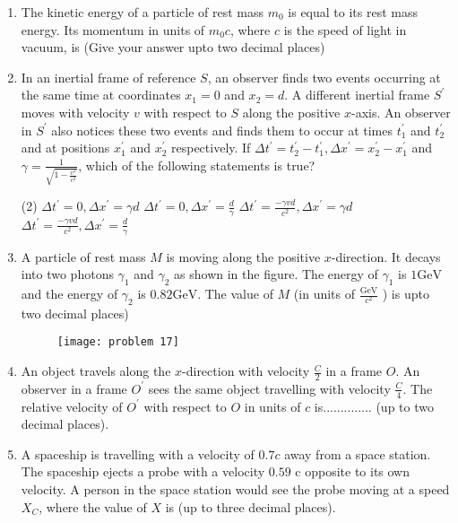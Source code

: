 \begin{enumerate}
	\item The kinetic energy of a particle of rest mass $m_{0}$ is equal to its rest mass energy. Its momentum in units of $m_{0} c$, where $c$ is the speed of light in vacuum, is
	(Give your answer upto two decimal places)
	{}

	\item In an inertial frame of reference $S$, an observer finds two events occurring at the same time at coordinates $x_{1}=0$ and $x_{2}=d$. A different inertial frame $S^{\prime}$ moves with velocity $v$ with respect to $S$ along the positive $x$-axis. An observer in $S^{\prime}$ also notices these two events and finds them to occur at times $t_{1}^{\prime}$ and $t_{2}^{\prime}$ and at positions $x_{1}^{\prime}$ and $x_{2}^{\prime}$ respectively.
	If $\Delta t^{\prime}=t_{2}^{\prime}-t_{1}^{\prime}, \Delta x^{\prime}=x_{2}^{\prime}-x_{1}^{\prime}$ and $\gamma=\frac{1}{\sqrt{1-\frac{v^{2}}{c^{2}}}}$, which of the following statements is true?
	{}
\begin{tasks}(2)
	\task[\textbf{A.}] $\Delta t^{\prime}=0, \Delta x^{\prime}=\gamma d$
	\task[\textbf{B.}] $\Delta t^{\prime}=0, \Delta x^{\prime}=\frac{d}{\gamma}$
	\task[\textbf{C.}]$\Delta t^{\prime}=\frac{-\gamma v d}{c^{2}}, \Delta x^{\prime}=\gamma d$
	\task[\textbf{D.}] $\Delta t^{\prime}=\frac{-\gamma v d}{c^{2}}, \Delta x^{\prime}=\frac{d}{\gamma}$
\end{tasks}

	\item A particle of rest mass $M$ is moving along the positive $x$-direction. It decays into two photons $\gamma_{1}$ and $\gamma_{2}$ as shown in the figure. The energy of $\gamma_{1}$ is $1 \mathrm{GeV}$ and the energy of $\gamma_{2}$ is $0.82 \mathrm{GeV}$. The value of $M$ (in units of $\frac{\mathrm{GeV}}{c^{2}}$ ) is upto two decimal places)
	{}
	\begin{figure}[H]
		\centering
		\texttt{[image: problem 17]}
	\end{figure}
	\item An object travels along the $x$-direction with velocity $\frac{C}{2}$ in a frame $O$. An observer in a frame $O^{\prime}$ sees the same object travelling with velocity $\frac{C}{4}$. The relative velocity of $O^{\prime}$ with respect to $O$ in units of $c$ is.............. (up to two decimal places).
	{}

	\item A spaceship is travelling with a velocity of $0.7 c$ away from a space station. The spaceship ejects a probe with a velocity $0.59$ c opposite to its own velocity. A person in the space station would see the probe moving at a speed $X_{C}$, where the value of $X$ is (up to three decimal places).
	{}


\end{enumerate}
